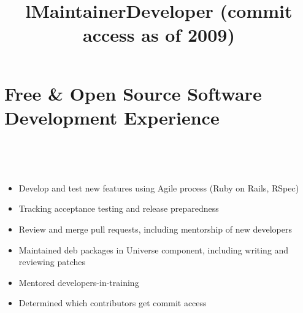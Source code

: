     \section{Free \& Open Source Software Development Experience}
        \begin{format}
            \\
            \title{l}\\
            \body
        \end{format}

        \location{}
        \title{Maintainer}
        \begin{position}
        	\vspace{-12pt}\begin{itemize}
	            \item Develop and test new features using Agile process (Ruby on Rails, RSpec)
	            \item Tracking acceptance testing and release preparedness
	            \item Review and merge pull requests, including mentorship of new developers
	        \end{itemize}
        \end{position}


        \location{}
        \title{Developer (commit access as of 2009)}
        \begin{position}
        	\vspace{-12pt}\begin{itemize}
	            \item Maintained deb packages in Universe component, including writing and reviewing patches
	            \item Mentored developers-in-training
	            \item Determined which contributors get commit access
            \end{itemize}
        \end{position}

